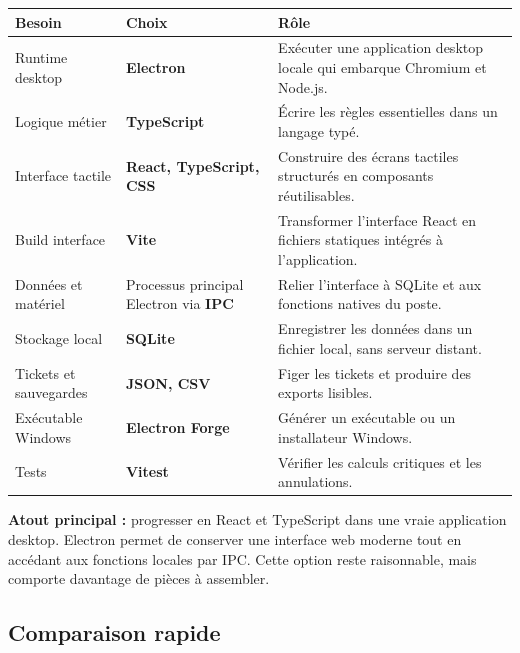 \documentclass[11pt,a4paper]{article}
\begin{document}
\begin{tabularx}{\textwidth}{L{3.15cm} L{3.15cm} Y}
  \toprule
  \color{white}\textbf{Besoin} &
  \color{white}\textbf{Choix} &
  \color{white}\textbf{Rôle} \\
  \midrule
  Runtime desktop &
  \textbf{Electron} &
  Exécuter une application desktop locale qui embarque Chromium et Node.js. \\
  Logique métier &
  \textbf{TypeScript} &
  Écrire les règles essentielles dans un langage typé. \\
  Interface tactile &
  \textbf{React, TypeScript, CSS} &
  Construire des écrans tactiles structurés en composants réutilisables. \\
  Build interface &
  \textbf{Vite} &
  Transformer l'interface React en fichiers statiques intégrés à l'application. \\
  Données et matériel &
  Processus principal Electron via \textbf{IPC} &
  Relier l'interface à SQLite et aux fonctions natives du poste. \\
  Stockage local &
  \textbf{SQLite} &
  Enregistrer les données dans un fichier local, sans serveur distant. \\
  Tickets et sauvegardes &
  \textbf{JSON, CSV} &
  Figer les tickets et produire des exports lisibles. \\
  Exécutable Windows &
  \textbf{Electron Forge} &
  Générer un exécutable ou un installateur Windows. \\
  Tests &
  \textbf{Vitest} &
  Vérifier les calculs critiques et les annulations. \\
  \bottomrule
\end{tabularx}

\vspace{3pt}
\textbf{Atout principal :} progresser en React et TypeScript dans une vraie application desktop.
Electron permet de conserver une interface web moderne tout en accédant aux fonctions locales
par IPC. Cette option reste raisonnable, mais comporte davantage de pièces à assembler.

\subsection{Comparaison rapide}
\end{document}
